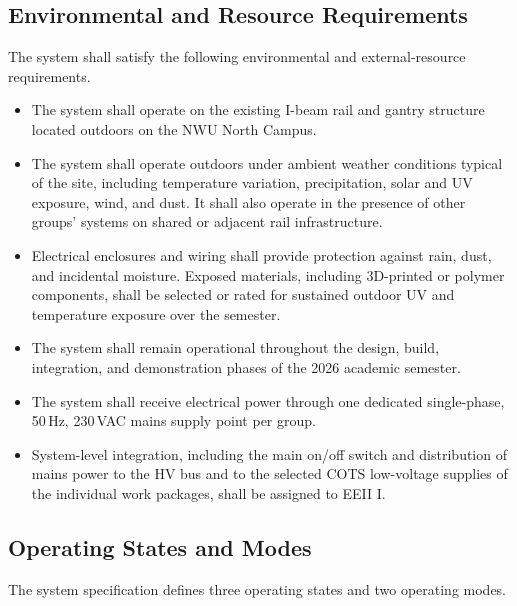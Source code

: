 \subsection{Environmental and Resource Requirements}
\label{subsec:environmental-req}

The system shall satisfy the following environmental and
external-resource requirements.

\begin{itemize}
    \item The system shall operate on the existing I-beam rail
    and gantry structure located outdoors on the NWU North Campus.

    \item The system shall operate outdoors under ambient
    weather conditions typical of the site, including
    temperature variation, precipitation, solar and UV
    exposure, wind, and dust. It shall also operate in the
    presence of other groups' systems on shared or adjacent
    rail infrastructure.

    \item Electrical enclosures and wiring shall provide
    protection against rain, dust, and incidental moisture.
    Exposed materials, including 3D-printed or polymer
    components, shall be selected or rated for sustained
    outdoor UV and temperature exposure over the semester.

    \item The system shall remain operational throughout the
    design, build, integration, and demonstration phases of
    the 2026 academic semester.

    \item The system shall receive electrical power through
    one dedicated single-phase, 50\,Hz, 230\,VAC mains
    supply point per group.

    \item System-level integration, including the main
    on/off switch and distribution of mains power to the
    HV bus and to the selected COTS low-voltage supplies
    of the individual work packages, shall be assigned
    to EEII I.
\end{itemize}


\subsection{Operating States and Modes}
\label{subsec:states-modes}

The system specification defines three operating states and
two operating modes.

